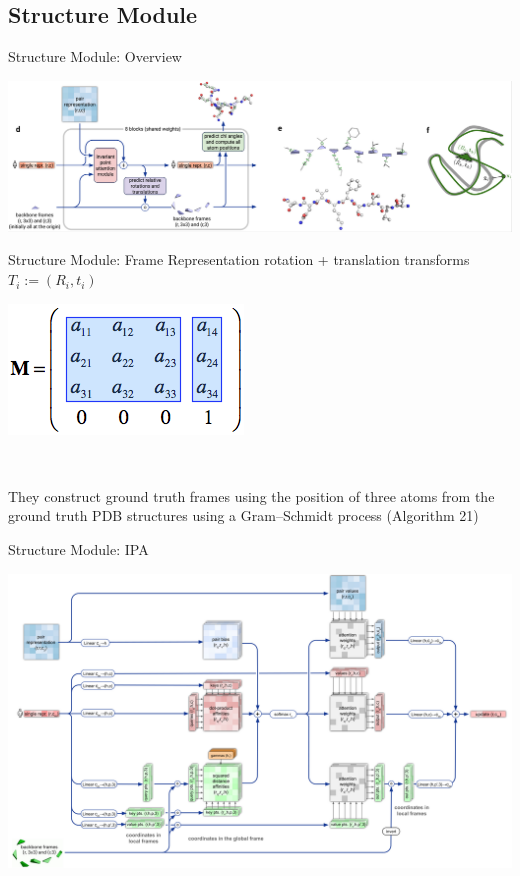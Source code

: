 \documentclass[presentation, smaller]{beamer}
\begin{document}
\subsection*{Structure Module}
\label{sec:org3bb0df3}
\begin{frame}[label={sec:orgafc855d}]{Structure Module: Overview}
\begin{center}
\includegraphics[width=.9\linewidth]{./imgs/model-structure.png}
\end{center}
\cite{jumperHighlyAccurateProtein2021}
\end{frame}
\begin{frame}[label={sec:orgc94754a}]{Structure Module: Frame Representation}
rotation + translation transforms \(T_i := (R_i,t_i)\)
\begin{center}
\includegraphics[height=.7\textheight]{./imgs/TransformationMatrix1.png}
\end{center}~\cite{SpatialTransformationMatrices}

They construct ground truth frames using the position of three atoms from the ground truth PDB structures using a Gram–Schmidt process (Algorithm 21)  \cite{SpatialTransformationMatrices}
\end{frame}
\begin{frame}[label={sec:orgd2a5d92}]{Structure Module: IPA}
\begin{center}
\includegraphics[width=.9\linewidth]{./imgs/ipa.png}
\end{center}~\cite{jumperHighlyAccurateProtein2021}
\end{frame}
\end{document}
